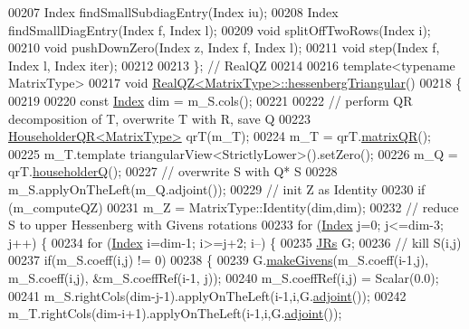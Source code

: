\begin{DoxyCode}
00207       Index findSmallSubdiagEntry(Index iu);
00208       Index findSmallDiagEntry(Index f, Index l);
00209       \textcolor{keywordtype}{void} splitOffTwoRows(Index i);
00210       \textcolor{keywordtype}{void} pushDownZero(Index z, Index f, Index l);
00211       \textcolor{keywordtype}{void} step(Index f, Index l, Index iter);
00212 
00213   \}; \textcolor{comment}{// RealQZ}
00214 
00216   \textcolor{keyword}{template}<\textcolor{keyword}{typename} MatrixType>
00217     \textcolor{keywordtype}{void} \hyperlink{group___eigenvalues___module_class_eigen_1_1_real_q_z}{RealQZ<MatrixType>::hessenbergTriangular}()
00218     \{
00219 
00220       \textcolor{keyword}{const} \hyperlink{group___eigenvalues___module_a6201e534e901b5f4e66f72c176b534a3}{Index} dim = m\_S.cols();
00221 
00222       \textcolor{comment}{// perform QR decomposition of T, overwrite T with R, save Q}
00223       \hyperlink{group___q_r___module}{HouseholderQR<MatrixType>} qrT(m\_T);
00224       m\_T = qrT.\hyperlink{group___q_r___module_ae837f2fb30099212c53b3042c7d699c9}{matrixQR}();
00225       m\_T.template triangularView<StrictlyLower>().setZero();
00226       m\_Q = qrT.\hyperlink{group___q_r___module_affd506c10ef2d25f56e7b1f9f25ff885}{householderQ}();
00227       \textcolor{comment}{// overwrite S with Q* S}
00228       m\_S.applyOnTheLeft(m\_Q.adjoint());
00229       \textcolor{comment}{// init Z as Identity}
00230       \textcolor{keywordflow}{if} (m\_computeQZ)
00231         m\_Z = MatrixType::Identity(dim,dim);
00232       \textcolor{comment}{// reduce S to upper Hessenberg with Givens rotations}
00233       \textcolor{keywordflow}{for} (\hyperlink{group___eigenvalues___module_a6201e534e901b5f4e66f72c176b534a3}{Index} j=0; j<=dim-3; j++) \{
00234         \textcolor{keywordflow}{for} (\hyperlink{group___eigenvalues___module_a6201e534e901b5f4e66f72c176b534a3}{Index} i=dim-1; i>=j+2; i--) \{
00235           \hyperlink{group___jacobi___module_class_eigen_1_1_jacobi_rotation}{JRs} G;
00236           \textcolor{comment}{// kill S(i,j)}
00237           \textcolor{keywordflow}{if}(m\_S.coeff(i,j) != 0)
00238           \{
00239             G.\hyperlink{group___jacobi___module_af73c81e9cc139b7e0d877ce553b02ec0}{makeGivens}(m\_S.coeff(i-1,j), m\_S.coeff(i,j), &m\_S.coeffRef(i-1, j));
00240             m\_S.coeffRef(i,j) = Scalar(0.0);
00241             m\_S.rightCols(dim-j-1).applyOnTheLeft(i-1,i,G.\hyperlink{group___jacobi___module_a89c8ea615f8fa77ddd5810a1e5fde4da}{adjoint}());
00242             m\_T.rightCols(dim-i+1).applyOnTheLeft(i-1,i,G.\hyperlink{group___jacobi___module_a89c8ea615f8fa77ddd5810a1e5fde4da}{adjoint}());

\end{DoxyCode}
